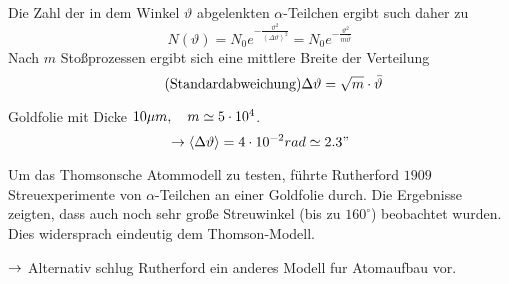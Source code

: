 Die Zahl der in dem Winkel $\vartheta$ abgelenkten $\alpha$-Teilchen ergibt
such daher zu
\begin{equation*}
    N(\vartheta) = N_0 e^{- \frac{\vartheta^2}{\left\langle \Delta \vartheta
    \right\rangle^2}} = N_0 e^{- \frac{\vartheta^2}{m\bar{\vartheta}}}
\end{equation*}
Nach $m$ Stoßprozessen ergibt sich eine mittlere Breite der Verteilung
\begin{equation*}
    \tag*{\text{(Standardabweichung)}}
    \Delta \vartheta = \sqrt{m} \cd \bar{\vartheta}
\end{equation*}
\begin{beis}
    Goldfolie mit Dicke $10 \mu m, \quad m \simeq 5 \cdot 10^4$.
    \begin{equation*}
        \rightarrow \left\langle \Delta \vartheta \right\rangle
        =
        4 \cdot 10^{-2} rad 
        \simeq 
        2.3"
    \end{equation*}
\end{beis}
Um das Thomsonsche Atommodell zu testen, führte Rutherford $1909$
Streuexperimente von $\alpha$-Teilchen an einer Goldfolie durch. Die Ergebnisse
zeigten, dass auch noch sehr große Streuwinkel (bis zu $160^{\circ}$) beobachtet
wurden. Dies widersprach eindeutig dem Thomson-Modell.

$\rightarrow$ Alternativ schlug Rutherford ein anderes Modell fur Atomaufbau vor.
